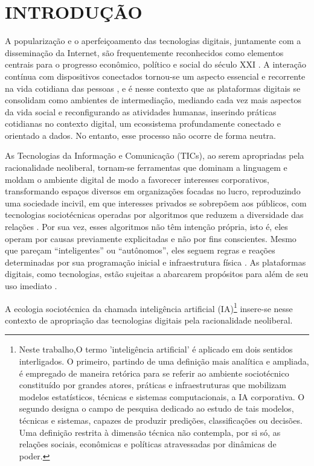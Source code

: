 




\chapter{INTRODUÇÃO}
\label{chap:introducao}

A popularização e o aperfeiçoamento das tecnologias digitais, juntamente com a disseminação da Internet, são frequentemente reconhecidos como elementos centrais para o progresso econômico, político e social do século XXI \cite{Silveira2021}. A interação contínua com dispositivos conectados tornou-se um aspecto essencial e recorrente na vida cotidiana das pessoas \cite{silveira-demcodigos}, e é nesse contexto que as plataformas digitais se consolidam como ambientes de intermediação, mediando cada vez mais aspectos da vida social e reconfigurando as atividades humanas, inserindo práticas cotidianas no contexto digital, um ecossistema profundamente conectado e orientado a dados. No entanto, esse processo não ocorre de forma neutra. 

As Tecnologias da Informação e Comunicação (TICs), ao serem apropriadas pela racionalidade neoliberal, tornam-se ferramentas que dominam a linguagem e moldam o ambiente digital de modo a favorecer interesses corporativos, transformando espaços diversos em organizações focadas no lucro, reproduzindo uma sociedade incivil, em que interesses privados se sobrepõem aos públicos, com tecnologias sociotécnicas operadas por algoritmos que reduzem a diversidade das relações \cite{Souza2024}. Por sua vez, esses algoritmos não têm intenção própria, isto é, eles operam por causas previamente explicitadas e não por fins conscientes. Mesmo que pareçam “inteligentes” ou “autônomos”, eles seguem regras e reações determinadas por sua programação inicial e infraestrutura física \cite{Faustino2023}. As plataformas digitais, como tecnologias, estão sujeitas a abarcarem propósitos para além de seu uso imediato \cite{Winner_2019}.

A ecologia sociotécnica da chamada inteligência artificial (IA)\footnote{Neste trabalho,O termo 'inteligência artificial' é aplicado em dois sentidos interligados. O primeiro, partindo de uma definição mais analítica e ampliada, é empregado de maneira retórica para se referir ao ambiente sociotécnico constituído por grandes atores, práticas e infraestruturas que mobilizam modelos estatísticos, técnicas e sistemas computacionais, a IA corporativa. O segundo designa o campo de pesquisa dedicado ao estudo de tais modelos, técnicas e sistemas, capazes de produzir predições, classificações ou decisões. Uma definição restrita à dimensão técnica não contempla, por si só, as relações sociais, econômicas e políticas atravessadas por dinâmicas de poder.} insere-se nesse contexto de apropriação das tecnologias digitais pela racionalidade neoliberal.

